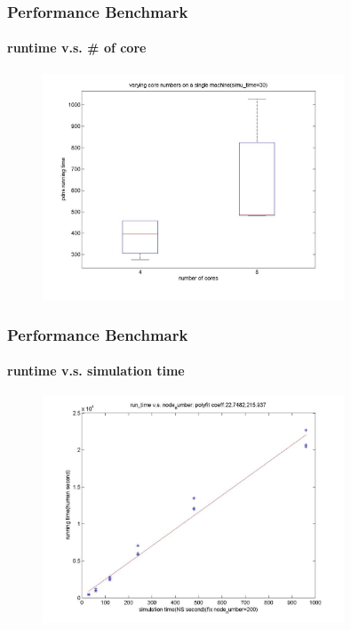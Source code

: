 \documentclass[14pt]{beamer}
\begin{document}
\begin{frame}
\frametitle{Performance Benchmark}
\framesubtitle{runtime v.s. \# of core}
\begin{figure}
	\includegraphics[width=0.8\textwidth]{../fig/runtime_vs_core.jpg}
\end{figure}
\end{frame}

\begin{frame}
\frametitle{Performance Benchmark}
\framesubtitle{runtime v.s. simulation time}
\begin{figure}
	\includegraphics[width=0.8\textwidth]{../fig/runtime_vs_nodenum.jpg}
\end{figure}
\end{frame}
\end{document}
